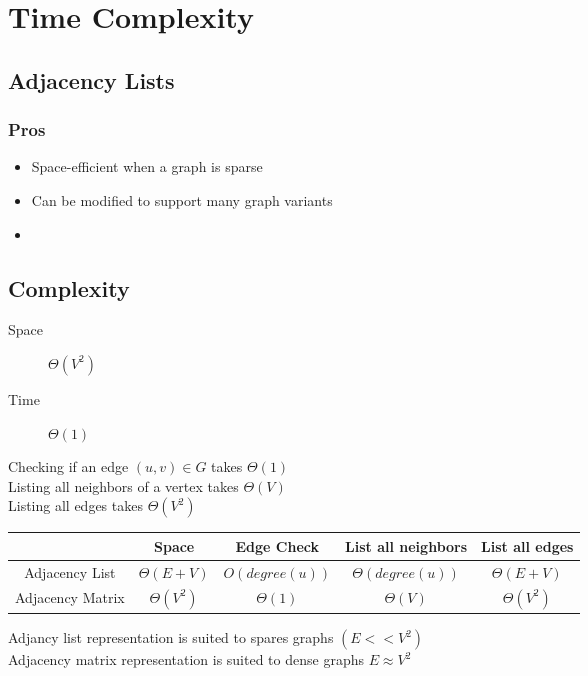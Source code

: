 \documentclass{article}
\begin{document}
\section*{Time Complexity}

\subsection*{Adjacency Lists}

\subsubsection*{Pros}
\begin{itemize}
    \item Space-efficient when a graph is sparse
    \item Can be modified to support many graph variants
\end{itemize}
\begin{itemize}
    \item
\end{itemize}

\subsection*{Complexity}
\begin{description}
    \item[Space]  \(\Theta(V^2)\)
    \item[Time] \(\Theta(1)\)
\end{description}
\noindent
Checking if an edge \((u, v) \in G\) takes \(\Theta(1)\) \\
Listing all neighbors of a vertex takes \(\Theta(V)\) \\
Listing all edges takes \(\Theta(V^2)\)

\begin{tabular}{c|c|c|c|c}
                     & Space             & Edge Check       & List all neighbors    & List all edges    \\
    \hline
    Adjacency List   & \(\Theta(E + V)\) & \(O(degree(u))\) & \(\Theta(degree(u))\) & \(\Theta(E + V)\) \\
    Adjacency Matrix & \(\Theta(V^2)\)   & \(\Theta(1)\)    & \(\Theta(V)\)         & \(\Theta(V^2)\)
\end{tabular}

Adjancy list representation is suited to spares graphs \((E << V^2)\) \\
Adjacency matrix representation is suited to dense graphs \(E \approx V^2\)
\end{document}
